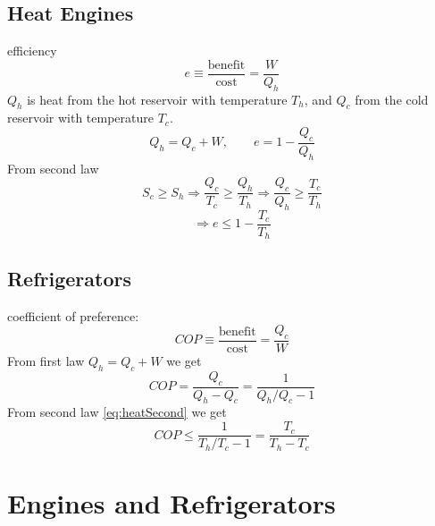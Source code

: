 \documentclass[a4paper,norsk, 10pt]{article}
\begin{document}
\subsection{Heat Engines}
efficiency
\begin{equation}
e \equiv \frac{\text{benefit}}{\text{cost}} = \frac{W}{Q_h}
\end{equation}
$Q_h$ is heat from the hot reservoir with temperature $T_h$, and $Q_c$ from the cold reservoir with temperature $T_c$.
\begin{equation}
Q_h = Q_c + W, \qquad e = 1 - \frac{Q_c}{Q_h}
\end{equation}
From second law
\begin{equation}
S_c \geq S_h \Rightarrow \frac{Q_c}{T_c} \geq \frac{Q_h}{T_h} \Rightarrow \frac{Q_c}{Q_h} \geq \frac{T_c}{T_h}
\label{eq:heatSecond}
\end{equation}
\begin{equation}
 \Rightarrow e \leq 1 - \frac{T_c}{T_h}
\end{equation}
\subsection{Refrigerators}
coefficient of preference:
\begin{equation}
COP \equiv \frac{\text{benefit}}{\text{cost}} = \frac{Q_c}{W}
\end{equation}
From first law $Q_h = Q_c + W$ we get
\begin{equation}
COP = \frac{Q_c}{Q_h - Q_c} = \frac{1}{Q_h/Q_c - 1}
\end{equation}
From second law \eqref{eq:heatSecond} we get
\begin{equation}
COP \leq \frac{1}{T_h/T_c - 1} = \frac{T_c}{T_h - T_c}
\end{equation}

\section{Engines and Refrigerators}
\end{document}
